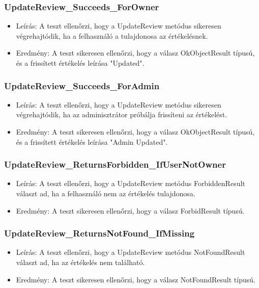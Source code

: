 \documentclass[11pt]{article}
\begin{document}
\subsubsection{UpdateReview\_Succeeds\_ForOwner}
\label{sec:org0031273}
\begin{itemize}
\item Leírás: A teszt ellenőrzi, hogy a UpdateReview metódus sikeresen végrehajtódik, ha a felhasználó a tulajdonosa az értékelésnek.
\item Eredmény: A teszt sikeresen ellenőrzi, hogy a válasz OkObjectResult típusú, és a frissített értékelés leírása "Updated".
\end{itemize}
\subsubsection{UpdateReview\_Succeeds\_ForAdmin}
\label{sec:orgd06933f}
\begin{itemize}
\item Leírás: A teszt ellenőrzi, hogy a UpdateReview metódus sikeresen végrehajtódik, ha az adminisztrátor próbálja frissíteni az értékelést.
\item Eredmény: A teszt sikeresen ellenőrzi, hogy a válasz OkObjectResult típusú, és a frissített értékelés leírása "Admin Updated".
\end{itemize}
\subsubsection{UpdateReview\_ReturnsForbidden\_IfUserNotOwner}
\label{sec:orga14aa3f}
\begin{itemize}
\item Leírás: A teszt ellenőrzi, hogy a UpdateReview metódus ForbiddenResult választ ad, ha a felhasználó nem az értékelés tulajdonosa.
\item Eredmény: A teszt sikeresen ellenőrzi, hogy a válasz ForbidResult típusú.
\end{itemize}
\subsubsection{UpdateReview\_ReturnsNotFound\_IfMissing}
\label{sec:org1118f2b}
\begin{itemize}
\item Leírás: A teszt ellenőrzi, hogy a UpdateReview metódus NotFoundResult választ ad, ha az értékelés nem található.
\item Eredmény: A teszt sikeresen ellenőrzi, hogy a válasz NotFoundResult típusú.
\end{itemize}
\end{document}
